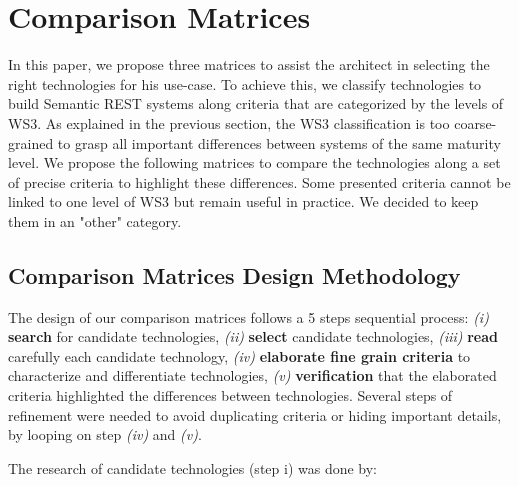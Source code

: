 \section{Comparison Matrices}\label{sec:matrix}

In this paper, we propose three matrices to assist the architect in selecting the right technologies for his use-case. To achieve this, we classify technologies to build Semantic REST systems along criteria that are categorized by the levels of WS3. As explained in the previous section, the WS3 classification is too coarse-grained to grasp all important differences between systems of the same maturity level. We propose the following matrices to compare the technologies along a set of precise criteria to highlight these differences. Some presented criteria cannot be linked to one level of WS3 but remain useful in practice. We decided to keep them in an "other" category.

\subsection{Comparison Matrices Design Methodology}


The design of our comparison matrices follows a 5 steps sequential process: \textit{(i)} \textbf{search} for candidate technologies, \textit{(ii)} \textbf{select} candidate technologies, \textit{(iii)} \textbf{read} carefully each candidate technology, \textit{(iv)} \textbf{elaborate fine grain criteria} to characterize and differentiate technologies, \textit{(v)} \textbf{verification} that the elaborated criteria highlighted the differences between technologies. Several steps of refinement were needed to avoid duplicating criteria or hiding important details, by looping on step \textit{(iv)} and \textit{(v)}.

The research of candidate technologies (step i) was done by:

